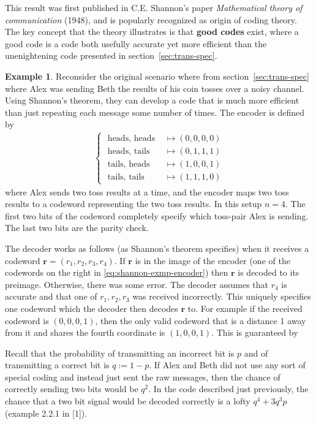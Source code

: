 \documentclass{article}
\renewcommand{\tt}[1]{\text{ #1 }}
\newcommand{\mt}{\mapsto}
\renewcommand{\=}{\equiv}
\renewcommand{\v}{\mathbf}
\theoremstyle{plain}
\theoremstyle{definition}
\newtheorem{exmp}{Example}[subsection]
\begin{document}
This result was first published in C.E. Shannon's paper \textit{Mathematical theory of communication} (1948), and is popularly recognized as origin of coding theory.
The key concept that the theory illustrates is that \textbf{good codes} exist, where a good code is a code both usefully accurate yet more efficient than the unenightening code presented in section~\ref{sec:trans-spec}.

\begin{exmp}
Reconsider the original scenario where from section~\ref{sec:trans-spec} where Alex was sending Beth the results of his coin tosses over a noisy channel.
Using Shannon's theorem, they can develop a code that is much more efficient than just repeating each message some number of times. The encoder is defined by
\begin{align}
  \label{eq:shannon-exmp-encoder}
  \begin{cases}
    \tt{heads, heads} &\mt (0,0,0,0) \\
    \tt{heads, tails} &\mt (0,1,1,1) \\
    \tt{tails, heads} &\mt (1,0,0,1) \\
    \tt{tails, tails} &\mt (1,1,1,0)
  \end{cases}
\end{align}
where Alex sends two toss results at a time, and the encoder maps two toss results to a codeword representing the two toss results. In this setup $n = 4$.
The first two bits of the codeword completely specify which toss-pair Alex is sending.
The last two bits are the parity check.

The decoder works as follows (as Shannon's theorem specifies) when it receives a codeword $\v r = (r_1, r_2, r_3, r_4)$.
If $\v r$ is in the image of the encoder (one of the codewords on the right in \ref{eq:shannon-exmp-encoder}) then $\v r$ is decoded to its preimage.
Otherwise, there was some error. The decoder assumes that $r_4$ is accurate and that one of $r_1, r_2, r_3$ was received incorrectly. This uniquely specifies one codeword which the decoder then decodes $\v r$ to. For example if the received codeword is $(0,0,0,1)$, then the only valid codeword that is a distance 1 away from it and shares the fourth coordinate is $(1,0,0,1)$.
This is guaranteed by

Recall that the probability of transmitting an incorrect bit is $p$ and of transmitting a correct bit is $q := 1-p$.
If Alex and Beth did not use any sort of special coding and instead just sent the raw messages, then the chance of correctly sending two bits would be $q^2$.
In the code described just previously, the chance that a two bit signal would be decoded correctly is a lofty $q^4 + 3q^3 p$ (example 2.2.1 in [1]).
\end{exmp}
\end{document}
